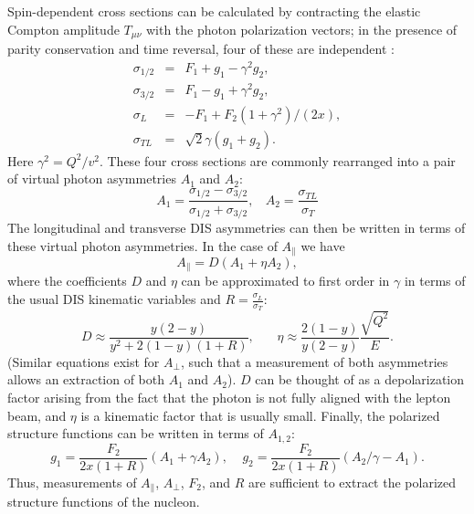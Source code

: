 Spin-dependent cross sections can be calculated by contracting the elastic Compton amplitude $T_{\mu \nu}$ with the photon polarization vectors; in the presence of parity conservation and time reversal, four of these are independent \cite{??}:
%
\begin{eqnarray}
  \sigma_{1/2} & = & F_1 + g_1 - \gamma^2 g_2, \nonumber \\
  \sigma_{3/2} & = & F_1 - g_1 + \gamma^2 g_2, \nonumber \\
  \sigma_L & = & -F_1 + F_2(1+\gamma^2)/(2x),  \nonumber \\
  \sigma_{TL} & = & \sqrt{2}\gamma (g_1+g_2).
\end{eqnarray}
%
Here $\gamma^2 = Q^2/v^2$.  These four cross sections are commonly rearranged into a pair of virtual photon asymmetries $A_1$ and $A_2$:
%
\begin{equation}
  A_1 = \frac{\sigma_{1/2} - \sigma_{3/2}}{\sigma_{1/2} + \sigma_{3/2}}, ~~~~ A_2 = \frac{\sigma_{TL}}{\sigma_T}
\end{equation}
%
The longitudinal and transverse DIS asymmetries can then be written in terms of these virtual photon asymmetries.  In the case of $A_{\parallel}$ we have
\begin{equation}
  A_{\parallel} = D(A_1 + \eta A_2),
\end{equation}
%
where the coefficients $D$ and $\eta$ can be approximated to first order in $\gamma$ in terms of the usual DIS kinematic variables and $R = \frac{\sigma_{L}}{\sigma_T}$:
\begin{equation}
  D \approx \frac{y(2-y)}{y^2 + 2(1-y)(1+R)}, ~~~~~~~~ \eta \approx \frac{2(1-y)}{y(2-y)} \frac{\sqrt{Q^2}}{E}.
\end{equation}
%
(Similar equations exist for $A_{\perp}$, such that a measurement of both asymmetries allows an extraction of both $A_1$ and $A_2$). $D$ can be thought of as a depolarization factor arising from the fact that the photon is not fully aligned with the lepton beam, and $\eta$ is a kinematic factor that is usually small.  Finally, the polarized structure functions can be written in terms of $A_{1,2}$:
\begin{equation}
  g_1 = \frac{F_2}{2x(1+R)}(A_1+\gamma A_2), ~~~~~ g_2 = \frac{F_2}{2x(1+R)}(A_2/\gamma - A_1).
\end{equation}
Thus, measurements of $A_{\parallel}$, $A_{\perp}$, $F_2$, and $R$ are sufficient to extract the polarized structure functions of the nucleon.

